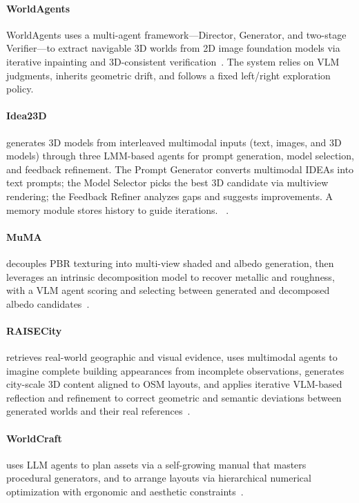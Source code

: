 \paragraph{WorldAgents}
WorldAgents uses a multi-agent framework—Director, Generator, and two-stage Verifier—to extract navigable 3D worlds from 2D image foundation models via iterative inpainting and 3D-consistent verification~\cite{avg260319708}. The system relies on VLM judgments, inherits geometric drift, and follows a fixed left/right exploration policy.

\paragraph{Idea23D} generates 3D models from interleaved multimodal inputs (text, images, and 3D models) through three LMM-based agents for prompt generation, model selection, and feedback refinement. The Prompt Generator converts multimodal IDEAs into text prompts; the Model Selector picks the best 3D candidate via multiview rendering; the Feedback Refiner analyzes gaps and suggests improvements. A memory module stores history to guide iterations. ~\cite{avg240404363}.

\paragraph{MuMA} decouples PBR texturing into multi-view shaded and albedo generation, then leverages an intrinsic decomposition model to recover metallic and roughness, with a VLM agent scoring and selecting between generated and decomposed albedo candidates~\cite{avg250318461}.

\paragraph{RAISECity} retrieves real-world geographic and visual evidence, uses multimodal agents to imagine complete building appearances from incomplete observations, generates city-scale 3D content aligned to OSM layouts, and applies iterative VLM-based reflection and refinement to correct geometric and semantic deviations between generated worlds and their real references~\cite{avg251118005}.

\paragraph{WorldCraft} uses LLM agents to plan assets via a self-growing manual that masters procedural generators, and to arrange layouts via hierarchical numerical optimization with ergonomic and aesthetic constraints~\cite{avg250215601}.

